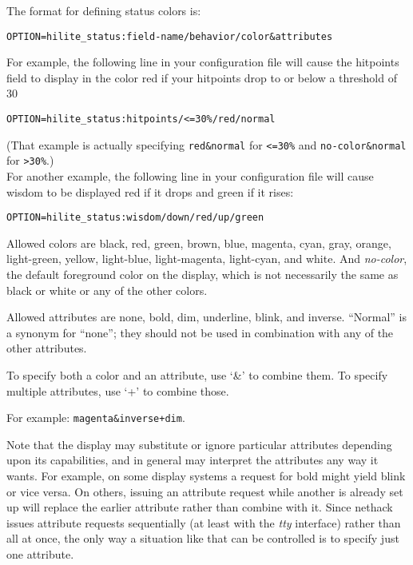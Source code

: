 The format for defining status colors is:\\
\begin{verbatim}
OPTION=hilite_status:field-name/behavior/color&attributes
\end{verbatim}

For example, the following line in your configuration file will cause
the hitpoints field to display in the color red if your hitpoints
drop to or below a threshold of 30%
\begin{verbatim}
OPTION=hilite_status:hitpoints/<=30%/red/normal
\end{verbatim}
(That example is actually specifying {\tt red\&normal} for  {\tt <=30\%}
and {\tt no-color\&normal} for {\tt >30\%}.)\\

For another example, the following line in your configuration file will cause
wisdom to be displayed red if it drops and green if it rises:\\
\begin{verbatim}
OPTION=hilite_status:wisdom/down/red/up/green
\end{verbatim}

Allowed colors are black, red, green, brown, blue, magenta, cyan, gray,
orange, light-green, yellow, light-blue, light-magenta, light-cyan, and white.
And {\it no-color}, the default foreground color on the display, which
is not necessarily the same as black or white or any of the other colors.

Allowed attributes are none, bold, dim, underline, blink, and inverse.
``Normal'' is a synonym for ``none''; they should not be used in
combination with any of the other attributes.

To specify both a color and an attribute, use `\&' to combine them.
To specify multiple attributes, use `+' to combine those.

For example: {\tt magenta\&inverse+dim}.

Note that the display may substitute or ignore particular attributes
depending upon its capabilities, and in general may interpret the
attributes any way it wants.
For example, on some display systems a request for bold might yield
blink or vice versa.
On others, issuing an attribute request while another is already
set up will replace the earlier attribute rather than combine with it.
Since nethack issues attribute requests sequentially (at least with
the {\it tty} interface) rather than all at once, the only way a
situation like that can be controlled is to specify just one attribute.

